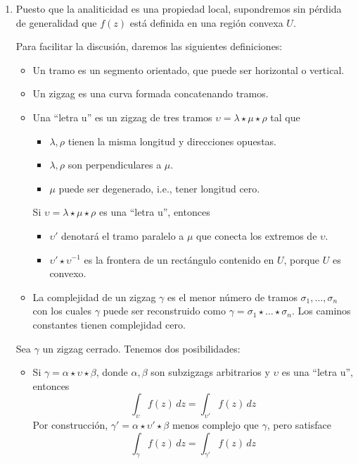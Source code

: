\begin{solution}
\leavevmode
\begin{enumerate}[label=(\alph*)]
    \item Puesto que la analiticidad es una propiedad local, supondremos sin pérdida de generalidad que $f(z)$ está definida en una región convexa $U$.
    
    Para facilitar la discusión, daremos las siguientes definiciones:
    \begin{itemize}
        \item Un tramo es un segmento orientado, que puede ser horizontal o vertical.
        
        \item Un zigzag es una curva formada concatenando tramos.
        
        \item Una ``letra u'' es un zigzag de tres tramos $\upsilon = \lambda \star \mu \star \rho$ tal que
        \begin{itemize}
            \item $\lambda, \rho$ tienen la misma longitud y direcciones opuestas.
            \item $\lambda, \rho$ son perpendiculares a $\mu$.
            \item $\mu$ puede ser degenerado, i.e., tener longitud cero.
        \end{itemize}
        
        Si $\upsilon = \lambda \star \mu \star \rho$ es una ``letra u'', entonces
        \begin{itemize}
            \item $\upsilon'$ denotará el tramo paralelo a $\mu$ que conecta los extremos de $\upsilon$.
            \item $\upsilon' \star \upsilon^{-1}$ es la frontera de un rectángulo contenido en $U$, porque $U$ es convexo.
        \end{itemize}
        
        \item La complejidad de un zigzag $\gamma$ es el menor número de tramos $\sigma_1, \dots, \sigma_n$ con los cuales $\gamma$ puede ser reconstruido como $\gamma = \sigma_1 \star \dots \star \sigma_n$. Los caminos constantes tienen complejidad cero.
    \end{itemize}
    
    Sea $\gamma$ un zigzag cerrado. Tenemos dos posibilidades:
    \begin{itemize}
        \item Si $\gamma = \alpha \star \upsilon \star \beta$, donde $\alpha, \beta$ son subzigzags arbitrarios y $\upsilon$ es una ``letra u'', entonces
        $$\int_\upsilon f(z) \, dz = \int_{\upsilon'} f(z) \, dz$$
        Por construcción, $\gamma' = \alpha \star \upsilon' \star \beta$ menos complejo que $\gamma$, pero satisface
        $$\int_\gamma f(z) \, dz = \int_{\gamma'} f(z) \, dz$$
        

\end{itemize}
\end{enumerate}
\end{solution}
